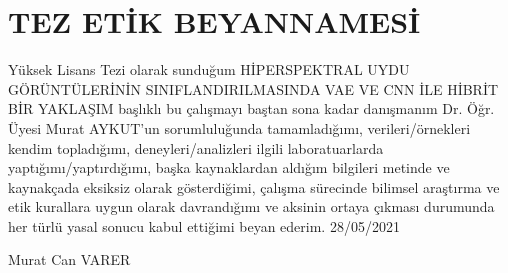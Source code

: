 \chapter*{TEZ ETİK BEYANNAMESİ}
    Yüksek Lisans Tezi olarak sunduğum HİPERSPEKTRAL UYDU GÖRÜNTÜLERİNİN SINIFLANDIRILMASINDA VAE VE CNN İLE HİBRİT BİR YAKLAŞIM başlıklı bu çalışmayı
baştan sona kadar danışmanım Dr. Öğr. Üyesi Murat AYKUT’un sorumluluğunda
tamamladığımı, verileri/örnekleri kendim topladığımı, deneyleri/analizleri ilgili
laboratuarlarda yaptığımı/yaptırdığımı, başka kaynaklardan aldığım bilgileri metinde ve
kaynakçada eksiksiz olarak gösterdiğimi, çalışma sürecinde bilimsel araştırma ve etik
kurallara uygun olarak davrandığımı ve aksinin ortaya çıkması durumunda her türlü yasal
sonucu kabul ettiğimi beyan ederim. 28/05/2021

\vspace{1.5cm}
\hfill Murat Can VARER

